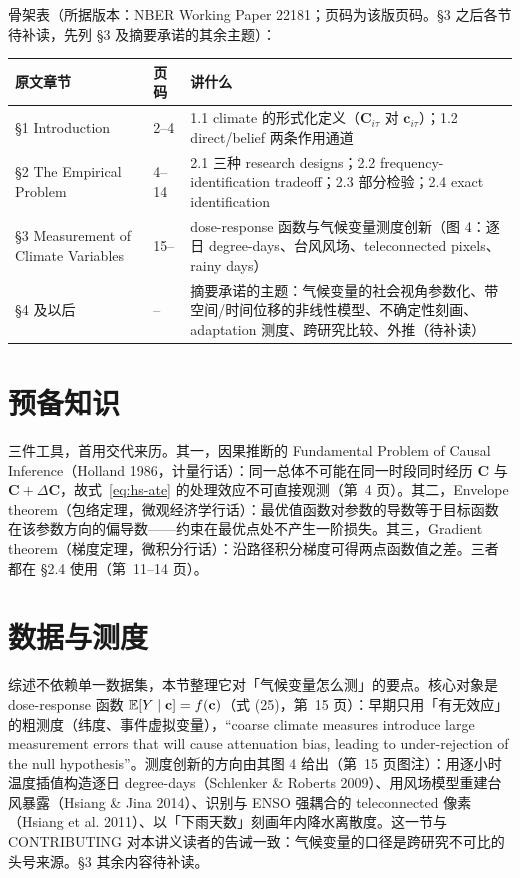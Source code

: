 骨架表（所据版本：NBER Working Paper 22181；页码为该版页码。§3 之后各节待补读，先列 §3 及摘要承诺的其余主题）：

\begin{table}[htbp]
\centering\small
\begin{tabular}{@{}p{4.2cm}p{1.4cm}p{7.4cm}@{}}
\toprule
原文章节 & 页码 & 讲什么 \\
\midrule
\S 1 Introduction & 2--4 & 1.1 climate 的形式化定义（$\mathbf{C}_{i\tau}$ 对 $\mathbf{c}_{i\tau}$）；1.2 direct/belief 两条作用通道 \\
\S 2 The Empirical Problem & 4--14 & 2.1 三种 research designs；2.2 frequency-identification tradeoff；2.3 部分检验；2.4 exact identification \\
\S 3 Measurement of Climate Variables & 15-- & dose-response 函数与气候变量测度创新（图 4：逐日 degree-days、台风风场、teleconnected pixels、rainy days） \\
\S 4 及以后 & -- & 摘要承诺的主题：气候变量的社会视角参数化、带空间/时间位移的非线性模型、不确定性刻画、adaptation 测度、跨研究比较、外推（待补读） \\
\bottomrule
\end{tabular}
\end{table}

\section{预备知识}

三件工具，首用交代来历。其一，因果推断的 Fundamental Problem of Causal Inference（Holland 1986，计量行话）：同一总体不可能在同一时段同时经历 $\mathbf{C}$ 与 $\mathbf{C}+\Delta\mathbf{C}$，故式~\ref{eq:hs-ate} 的处理效应不可直接观测（第~4 页）。其二，Envelope theorem（包络定理，微观经济学行话）：最优值函数对参数的导数等于目标函数在该参数方向的偏导数——约束在最优点处不产生一阶损失。其三，Gradient theorem（梯度定理，微积分行话）：沿路径积分梯度可得两点函数值之差。三者都在 \S 2.4 使用（第~11--14 页）。

\section{数据与测度}

综述不依赖单一数据集，本节整理它对「气候变量怎么测」的要点。核心对象是 dose-response 函数 $\mathbb{E}[Y\mid\mathbf{c}] = f(\mathbf{c})$（式 (25)，第~15 页）：早期只用「有无效应」的粗测度（纬度、事件虚拟变量），``coarse climate measures introduce large measurement errors that will cause attenuation bias, leading to under-rejection of the null hypothesis''\citep[第~15 页]{hsiang2016climate}。测度创新的方向由其图 4 给出（第~15 页图注）：用逐小时温度插值构造逐日 degree-days（Schlenker \& Roberts 2009）、用风场模型重建台风暴露（Hsiang \& Jina 2014）、识别与 ENSO 强耦合的 teleconnected 像素（Hsiang et al. 2011）、以「下雨天数」刻画年内降水离散度。这一节与 CONTRIBUTING 对本讲义读者的告诫一致：气候变量的口径是跨研究不可比的头号来源。§3 其余内容待补读。

